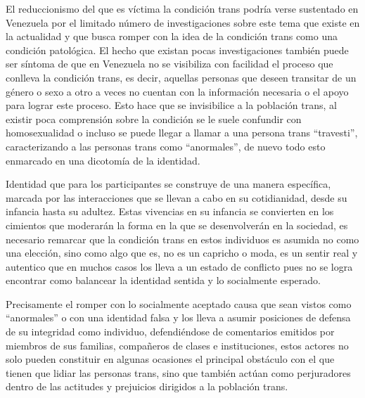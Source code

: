 El reduccionismo del que es víctima la condición trans podría verse sustentado
en Venezuela por el limitado número de investigaciones sobre este tema que
existe en la actualidad y que busca romper con la idea de la condición trans
como una condición patológica. El hecho que existan pocas investigaciones
también puede ser síntoma de que en Venezuela no se visibiliza con facilidad el
proceso que conlleva la condición trans, es decir, aquellas personas que deseen
transitar de un género o sexo a otro a veces no cuentan con la información
necesaria o el apoyo para lograr este proceso. Esto hace que se invisibilice a
la población trans, al existir poca comprensión sobre la condición se le suele
confundir con homosexualidad o incluso se puede llegar a llamar a una persona
trans “travesti”, caracterizando a las personas trans como “anormales”, de nuevo
todo esto enmarcado en una dicotomía de la identidad.

Identidad que para los participantes se construye de una manera específica,
marcada por las interacciones que se llevan a cabo en su cotidianidad, desde su
infancia hasta su adultez.  Estas vivencias en su infancia se convierten en los
cimientos que moderarán la forma en la que se desenvolverán en la sociedad, es
necesario remarcar que la condición trans en estos individuos es asumida no como
una elección, sino como algo que es, no es un capricho o moda, es un sentir real
y autentico que en muchos casos los lleva a un estado de conflicto pues no se
logra encontrar como balancear la identidad sentida y lo socialmente esperado.

Precisamente el romper con lo socialmente aceptado causa que sean vistos como
“anormales” o con una identidad falsa y los lleva a asumir posiciones de defensa
de su integridad como individuo, defendiéndose de comentarios emitidos por
miembros de sus familias, compañeros de clases e instituciones, estos actores no
solo pueden constituir en algunas ocasiones el principal obstáculo con el que
tienen que lidiar las personas trans, sino que también actúan como perjuradores
dentro de las actitudes y prejuicios dirigidos a la población trans.


